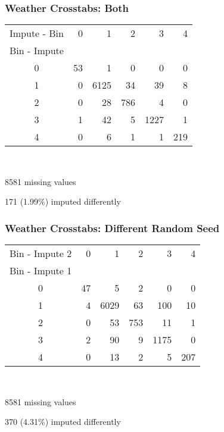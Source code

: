 \begin{frame}[t]
	\frametitle{Weather Crosstabs:  Both}
	\Large
	
\begin{tabular}{crrrrr}
Impute - Bin &   0 &     1 &    2 &     3 &    4 \\
Bin - Impute &     &       &      &       &      \\
\hline
0    &  53 &     1 &    0 &     0 &    0 \\
1    &   0 &  6125 &   34 &    39 &    8 \\
2    &   0 &    28 &  786 &     4 &    0 \\
3    &   1 &    42 &    5 &  1227 &    1 \\
4    &   0 &     6 &    1 &     1 &  219 \\
\end{tabular}	

\

8581 missing values

 171 (1.99\%) imputed differently

\end{frame}

\begin{frame}[t]
	\frametitle{Weather Crosstabs:  Different Random Seed}
	\Large
	
\begin{tabular}{crrrrr}
Bin - Impute 2 &   0 &     1 &    2 &     3 &    4 \\
Bin - Impute 1 &     &       &      &       &      \\
\hline
0              &  47 &     5 &    2 &     0 &    0 \\
1              &   4 &  6029 &   63 &   100 &   10 \\
2              &   0 &    53 &  753 &    11 &    1 \\
3              &   2 &    90 &    9 &  1175 &    0 \\
4              &   0 &    13 &    2 &     5 &  207 \\
\end{tabular}

\

8581 missing values

 370 (4.31\%) imputed differently

\end{frame}
